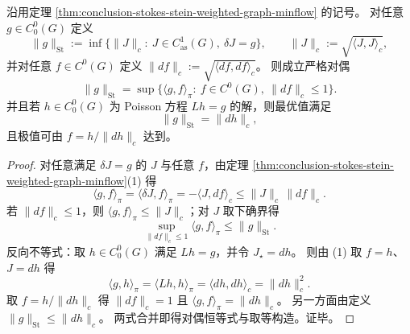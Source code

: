 \begin{corollary}\label{cor:conclusion-stokes-stein-dual-norm}
沿用定理 \ref{thm:conclusion-stokes-stein-weighted-graph-minflow} 的记号。
对任意 \(g\in C^0_0(G)\) 定义
\[
\|g\|_{\mathrm{St}}:=\inf\{\|J\|_c:\ J\in C^1_{\mathrm{as}}(G),\ \delta J=g\},
\qquad
\|J\|_c:=\sqrt{\langle J,J\rangle_c},
\]
并对任意 \(f\in C^0(G)\) 定义 \(\|df\|_c:=\sqrt{\langle df,df\rangle_c}\)。
则成立严格对偶
\[
\|g\|_{\mathrm{St}}
=\sup\{\langle g,f\rangle_\pi:\ f\in C^0(G),\ \|df\|_c\le 1\}.
\]
并且若 \(h\in C^0_0(G)\) 为 Poisson 方程 \(Lh=g\) 的解，则最优值满足
\[
\|g\|_{\mathrm{St}}=\|dh\|_c,
\]
且极值可由 \(f=h/\|dh\|_c\) 达到。
\end{corollary}
\begin{proof}
对任意满足 \(\delta J=g\) 的 \(J\) 与任意 \(f\)，由定理 \ref{thm:conclusion-stokes-stein-weighted-graph-minflow}(1) 得
\[
\langle g,f\rangle_\pi=\langle \delta J,f\rangle_\pi=-\langle J,df\rangle_c
\le \|J\|_c\,\|df\|_c.
\]
若 \(\|df\|_c\le 1\)，则 \(\langle g,f\rangle_\pi\le \|J\|_c\)；对 \(J\) 取下确界得
\[
\sup_{\|df\|_c\le 1}\langle g,f\rangle_\pi\le \|g\|_{\mathrm{St}}.
\]
反向不等式：取 \(h\in C^0_0(G)\) 满足 \(Lh=g\)，并令 \(J_\star=dh\)。
则由 (1) 取 \(f=h\)、\(J=dh\) 得
\[
\langle g,h\rangle_\pi=\langle Lh,h\rangle_\pi=\langle dh,dh\rangle_c=\|dh\|_c^2.
\]
取 \(f=h/\|dh\|_c\) 得 \(\|df\|_c=1\) 且
\(
\langle g,f\rangle_\pi=\|dh\|_c
\)。
另一方面由定义 \(\|g\|_{\mathrm{St}}\le \|dh\|_c\)。
两式合并即得对偶恒等式与取等构造。证毕。
\end{proof}

